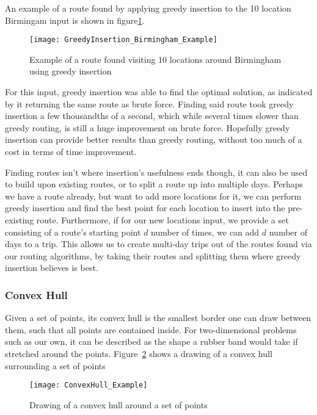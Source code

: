 \noindent
An example of a route found by applying greedy insertion to the 10 location Birmingam input is shown in figure\ref{fig:GreedyInsertion_Birmingham_Example}.
\begin{figure}[H]
    \centering
    \texttt{[image: GreedyInsertion\_Birmingham\_Example]}
    \caption{Example of a route found visiting 10 locations around Birmingham using greedy insertion}
    \label{fig:GreedyInsertion_Birmingham_Example}
\end{figure}

\noindent
For this input, greedy insertion was able to find the optimal solution, as indicated by it returning the same route
as brute force.
Finding said route took greedy insertion a few thousandths of a second, which while several times slower than greedy
routing, is still a huge improvement on brute force.
Hopefully greedy insertion can provide better results than greedy routing, without too much of a cost in terms of
time improvement.

Finding routes isn't where insertion's usefulness ends though, it can also be used to build upon existing routes,
or to split a route up into multiple days.
Perhaps we have a route already, but want to add more locations for it, we can perform greedy insertion and find the
best point for each location to insert into the pre-existing route.
Furthermore, if for our new locations input, we provide a set consisting of a route's starting point $d$ number of
times, we can add $d$ number of days to a trip.
This allows us to create multi-day trips out of the routes found via our routing algorithms, by taking their routes
and splitting them where greedy insertion believes is best.

\subsubsection{Convex Hull}\label{subsubsec:convex-hull}
Given a set of points, its convex hull is the smallest border one can draw between them, such that all points are
contained inside.
For two-dimensional problems such as our own, it can be described as the shape a rubber band would take if stretched 
around the points.
Figure~\ref{fig:ConvexHull_Example} shows a drawing of a convex hull surrounding a set of points
\begin{figure}[H]
    \centering
    \texttt{[image: ConvexHull\_Example]}
    \caption{Drawing of a convex hull around a set of points}
    \label{fig:ConvexHull_Example}
\end{figure}

